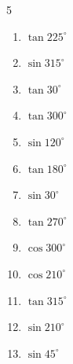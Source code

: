 \begin{multicols}{5}
\begin{enumerate}
  \item $\displaystyle \tan{225^\circ}$

        \phantom{$\displaystyle =1$}

  \item $\displaystyle \sin{315^\circ}$


  \item $\displaystyle \tan{30^\circ}$


  \item $\displaystyle \tan{300^\circ}$


  \item $\displaystyle \sin{120^\circ}$


  \item $\displaystyle \tan{180^\circ}$

        \phantom{$\displaystyle =0$}

  \item $\displaystyle \sin{30^\circ}$


  \item $\displaystyle \tan{270^\circ}$

        \phantom{$\displaystyle なし$}

  \item $\displaystyle \cos{300^\circ}$


\columnbreak %

  \item $\displaystyle \cos{210^\circ}$


  \item $\displaystyle \tan{315^\circ}$

        \phantom{$\displaystyle =-1$}

  \item $\displaystyle \sin{210^\circ}$


  \item $\displaystyle \sin{45^\circ}$


\end{enumerate}
\end{multicols}
